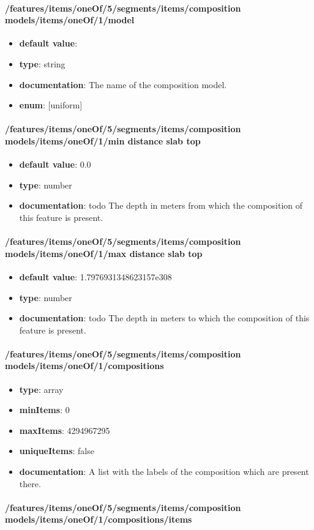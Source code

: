 \paragraph{/features/items/oneOf/5/segments/items/composition models/items/oneOf/1/model}
\begin{itemize}\item {\bf default value}: 
\item {\bf type}: string
\item {\bf documentation}: The name of the composition model.
\item {\bf enum}: [uniform]\end{itemize}\paragraph{/features/items/oneOf/5/segments/items/composition models/items/oneOf/1/min distance slab top}
\begin{itemize}\item {\bf default value}: 0.0
\item {\bf type}: number
\item {\bf documentation}: todo The depth in meters from which the composition of this feature is present.
\end{itemize}\paragraph{/features/items/oneOf/5/segments/items/composition models/items/oneOf/1/max distance slab top}
\begin{itemize}\item {\bf default value}: 1.7976931348623157e308
\item {\bf type}: number
\item {\bf documentation}: todo The depth in meters to which the composition of this feature is present.
\end{itemize}\paragraph{/features/items/oneOf/5/segments/items/composition models/items/oneOf/1/compositions}
\begin{itemize}\item {\bf type}: array
\item {\bf minItems}: 0
\item {\bf maxItems}: 4294967295
\item {\bf uniqueItems}: false
\item {\bf documentation}: A list with the labels of the composition which are present there.
\end{itemize}\paragraph{/features/items/oneOf/5/segments/items/composition models/items/oneOf/1/compositions/items}
